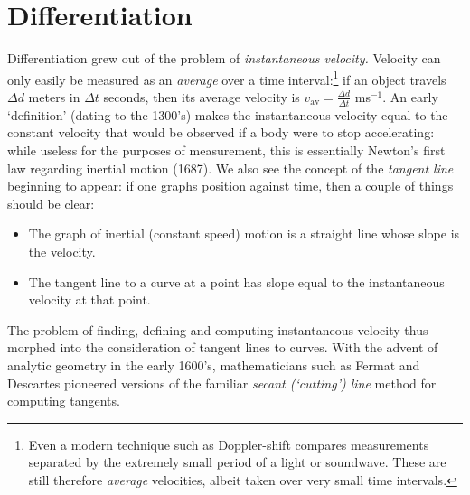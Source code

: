 \graphicspath{{3diff/asy/}}

\section{Differentiation}

Differentiation grew out of the problem of \emph{instantaneous velocity.} Velocity can only easily be measured as an \emph{average} over a time interval:\footnote{Even a modern technique such as Doppler-shift compares measurements separated by the extremely small period of a light or soundwave. These are still therefore \emph{average} velocities, albeit taken over very small time intervals.} if an object travels $\Delta d$ meters in $\Delta t$ seconds, then its average velocity is $v_\text{av}=\frac{\Delta d}{\Delta t}$ ms$^{-1}$. An early `definition' (dating to the 1300's) makes the instantaneous velocity equal to the constant velocity that would be observed if a body were to stop accelerating: while useless for the purposes of measurement, this is essentially Newton's first law regarding inertial motion (1687). We also see the concept of the \emph{tangent line} beginning to appear: if one graphs position against time, then a couple of things should be clear:
\begin{itemize}
  \item The graph of inertial (constant speed) motion is a straight line whose slope is the velocity.
  \item The tangent line to a curve at a point has slope equal to the instantaneous velocity at that point. 
\end{itemize}
The problem of finding, defining and computing instantaneous velocity thus morphed into the consideration of tangent lines to curves. With the advent of analytic geometry in the early 1600's, mathematicians such as Fermat and Descartes pioneered versions of the familiar \emph{secant (`cutting') line} method for computing tangents.

